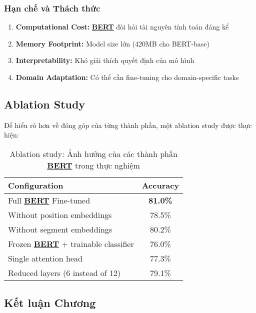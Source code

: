 \subsubsection{Hạn chế và Thách thức}

\begin{enumerate}
    \item \textbf{Computational Cost:} \hyperref[acro:bert]{\textbf{BERT}} đòi hỏi tài nguyên tính toán đáng kể
    \item \textbf{Memory Footprint:} Model size lớn (420MB cho BERT-base)
    \item \textbf{Interpretability:} Khó giải thích quyết định của mô hình
    \item \textbf{Domain Adaptation:} Có thể cần fine-tuning cho domain-specific
    tasks
\end{enumerate}

\subsection{Ablation Study}
\label{ssec:ablation_study_exp}

Để hiểu rõ hơn về đóng góp của từng thành phần, một ablation study được thực hiện:

\begin{table}[H]
\centering
\caption{Ablation study: Ảnh hưởng của các thành phần \hyperref[acro:bert]{\textbf{BERT}} trong thực nghiệm}
\label{tab:ablation}
\begin{tabular}{lc}
\toprule
\textbf{Configuration} & \textbf{Accuracy} \\
\midrule
Full \hyperref[acro:bert]{\textbf{BERT}} Fine-tuned & \textbf{81.0\%} \\
Without position embeddings & 78.5\% \\
Without segment embeddings & 80.2\% \\
Frozen \hyperref[acro:bert]{\textbf{BERT}} + trainable classifier & 76.0\% \\
Single attention head & 77.3\% \\
Reduced layers (6 instead of 12) & 79.1\% \\
\bottomrule
\end{tabular}
\end{table}

\subsection{Kết luận Chương}
\label{ssec:ket_luan_chuong}

